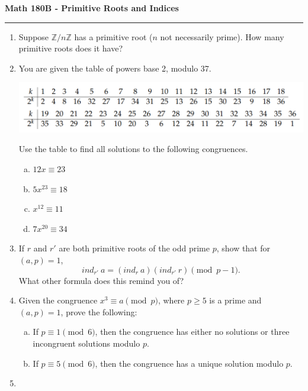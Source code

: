 \documentclass[11pt,letterpaper]{report}
\newcommand{\integers}{\mathbb{Z}}
\begin{document}
\begin{center}
{\bf \Large Math 180B - Primitive Roots and Indices}
\vspace{0.2cm}
\hrule
\end{center}

\begin{enumerate}
	\item Suppose $\integers/n\integers$ has a primitive root ($n$ not necessarily prime). How many primitive roots does it have?

	\vfill

	\item You are given the table of powers base 2, modulo 37.\\
	\centerline{\includegraphics[scale=0.6]{table.PNG}}
	Use the table to find all solutions to the following congruences.
	\begin{enumerate}[(a)]
		\item $12x\equiv 23$
		\item $5x^{23}\equiv 18$
		\item $x^{12} \equiv 11$
		\item $7x^{20}\equiv 34$
	\end{enumerate}

	\vfill

	\item If $r$ and $r'$ are both primitive roots of the odd prime $p$, show that for $(a, p)= 1$,
	\[
	ind_{r'}\ a = (ind_r\ a)(ind_{r'}\ r)\pmod{p-1}.
	\]
	What other formula does this remind you of?

	\vfill

	\item Given the congruence $x^3\equiv a\pmod{p}$, where $p\geq 5$ is a prime and $(a, p) = 1$, prove the following:
	\begin{enumerate}[(a)]
		\item If $p\equiv 1\pmod{6}$, then the congruence has either no solutions or three incongruent solutions modulo $p$.
		\vfill
		\item If $p\equiv 5\pmod{6}$, then the congruence has a unique solution modulo $p$.
	\end{enumerate}

	\vfill

	\item 


\end{enumerate}
\end{document}
